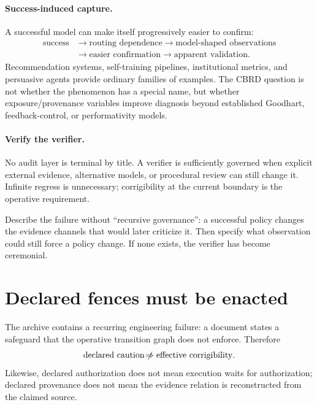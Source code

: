 \paragraph{Success-induced capture.}
A successful model can make itself progressively easier to confirm:
\begin{equation}
\begin{aligned}
\text{success}&\rightarrow\text{routing dependence}\rightarrow\text{model-shaped observations}\\
&\rightarrow\text{easier confirmation}\rightarrow\text{apparent validation}.
\end{aligned}
\label{eq:deep-capture}
\end{equation}
Recommendation systems, self-training pipelines, institutional metrics, and persuasive agents provide ordinary families of examples. The CBRD question is not whether the phenomenon has a special name, but whether exposure/provenance variables improve diagnosis beyond established Goodhart, feedback-control, or performativity models.

\paragraph{Verify the verifier.}
No audit layer is terminal by title. A verifier is sufficiently governed when explicit external evidence, alternative models, or procedural review can still change it. Infinite regress is unnecessary; corrigibility at the current boundary is the operative requirement.

\begin{readercheck}
Describe the failure without ``recursive governance'': a successful policy changes the evidence channels that would later criticize it. Then specify what observation could still force a policy change. If none exists, the verifier has become ceremonial.
\end{readercheck}

\section{Declared fences must be enacted}

The archive contains a recurring engineering failure: a document states a safeguard that the operative transition graph does not enforce. Therefore
\begin{equation}
\text{declared caution}\mathrel{\not\!\Rightarrow}\text{effective corrigibility}.
\end{equation}
Likewise, declared authorization does not mean execution waits for authorization; declared provenance does not mean the evidence relation is reconstructed from the claimed source.

